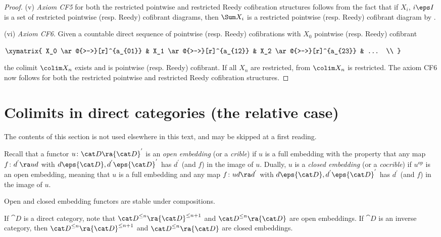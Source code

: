\begin{proof}
(v) {\it Axiom CF5} for both the restricted pointwise and restricted Reedy cofibration structures follows from the fact that if $X_i$, $i \eps I$ is a set of restricted pointwise (resp. Reedy) cofibrant diagrams, then $\Sum X_i$ is a restricted pointwise (resp. Reedy) cofibrant diagram by .

(vi) {\it Axiom CF6}. Given a countable direct sequence of pointwise (resp. Reedy) cofibrations with $X_0$ pointwise (resp. Reedy) cofibrant
\begin{center}
$ \xymatrix {
        X_0 \ar@{>->}[r]^{a_{01}} &
        X_1 \ar@{>->}[r]^{a_{12}} &
        X_2 \ar@{>->}[r]^{a_{23}} &
	... \\
	}$
\end{center}
the colimit $\colim X_n$ exists and is pointwise (resp. Reedy) cofibrant. If all $X_n$ are restricted, from  $\colim X_n$ is restricted. The axiom CF6 now follows for both the restricted pointwise and restricted Reedy cofibration structures.
\end{proof}


\section{Colimits in direct categories (the relative case)}
\label{sec:colimdirectrelative}

The contents of this section is not used elsewhere in this text, and may be skipped at a first reading. 

Recall that a functor $u \colon {\cat D} \ra {\cat D}^{'}$ is an {\it open embedding} (or a {\it crible})  if $u$ is a full embedding with the property that any map $f \colon d^{'} \ra ud$ with $d \eps {\cat D}, d^{'} \eps {\cat D}^{'}$ has $d^{'}$ (and $f$) in the image of $u$. Dually, $u$ is a {\it closed embedding} (or a {\it cocrible})  if $u^{op}$ is an open embedding, meaning that $u$ is a full embedding and any map $f \colon ud \ra d^{'}$ with $d \eps {\cat D}, d^{'} \eps {\cat D}^{'}$ has $d^{'}$ (and $f$) in the image of $u$.

Open and closed embedding functors are stable under compositions. 

If ${\cat D}$ is a direct category, note that ${\cat D}^{\le n} \ra {\cat D}^{\le n+1}$ and ${\cat D}^{\le n} \ra {\cat D}$ are open embeddings. If ${\cat D}$ is an inverse category, then ${\cat D}^{\le n} \ra {\cat D}^{\le n+1}$ and ${\cat D}^{\le n} \ra {\cat D}$ are closed embeddings.


